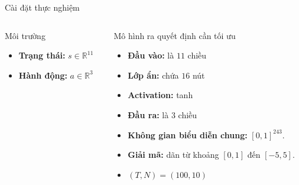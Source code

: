     \begin{frame}{Cài đặt thực nghiệm}
        \begin{columns}
            \begin{column}{0.48\textwidth}
                \begin{block}{Môi trường}
                    \begin{itemize}
                        \item \textbf{Trạng thái:} $s \in \mathbb{R}^{11}$
                        \item \textbf{Hành động:} $a \in \mathbb{R}^{3}$
                    \end{itemize}
                \end{block}
            \end{column}
            \begin{column}{0.48\textwidth}
                \begin{block}{Mô hình ra quyết định cần tối ưu}
                    \begin{itemize}
                        \item \textbf{Đầu vào: } là $11$ chiều
                        \item \textbf{Lớp ẩn: } chứa $16$ nút
                        \item \textbf{Activation: } tanh
                        \item \textbf{Đầu ra: } là $3$ chiều
                        \item \textbf{Không gian biểu diễn chung:} $[0, 1] ^ {243}$.
                        \item \textbf{Giải mã: } dãn từ khoảng $[0, 1]$ đến $[-5, 5]$.
                        \item $(T, N) = (100, 10)$
                    \end{itemize}
                \end{block}
            \end{column}
        \end{columns}
    \end{frame}

